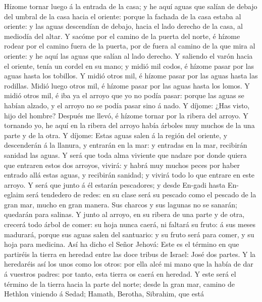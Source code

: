  Hízome tornar luego á la entrada de la casa; y he aquí
aguas que salían de debajo del umbral de la casa hacia el oriente:
porque la fachada de la casa estaba al oriente: y las aguas descendían
de debajo, hacia el lado derecho de la casa, al mediodía del altar.
 Y sacóme por el camino de la puerta del norte, é hízome
rodear por el camino fuera de la puerta, por de fuera al camino de la
que mira al oriente: y he aquí las aguas que salían al lado derecho.
 Y saliendo el varón hacia el oriente, tenía un cordel en
su mano; y midió mil codos, é hízome pasar por las aguas hasta los
tobillos.  Y midió otros mil, é hízome pasar por las aguas
hasta las rodillas. Midió luego otros mil, é hízome pasar por las aguas
hasta los lomos.  Y midió otros mil, é iba ya el arroyo
que yo no podía pasar: porque las aguas se habían alzado, y el arroyo no
se podía pasar sino á nado.  Y díjome: ¿Has visto, hijo
del hombre? Después me llevó, é hízome tornar por la ribera del arroyo.
 Y tornando yo, he aquí en la ribera del arroyo había
árboles muy muchos de la una parte y de la otra.  Y
díjome: Estas aguas salen á la región del oriente, y descenderán á la
llanura, y entrarán en la mar: y entradas en la mar, recibirán sanidad
las aguas.  Y será que toda alma viviente que nadare por
donde quiera que entraren estos dos arroyos, vivirá: y habrá muy muchos
peces por haber entrado allá estas aguas, y recibirán sanidad; y vivirá
todo lo que entrare en este arroyo.  Y será que junto á
él estarán pescadores; y desde En-gadi hasta En-eglaim será tendedero de
redes: en su clase será su pescado como el pescado de la gran mar, mucho
en gran manera.  Sus charcos y sus lagunas no se sanarán;
quedarán para salinas.  Y junto al arroyo, en su ribera
de una parte y de otra, crecerá todo árbol de comer: su hoja nunca
caerá, ni faltará su fruto: á sus meses madurará, porque sus aguas salen
del santuario: y su fruto será para comer, y su hoja para medicina.
 Así ha dicho el Señor Jehová: Este es el término en que
partiréis la tierra en heredad entre las doce tribus de Israel: José dos
partes.  Y la heredaréis así los unos como los otros: por
ella alcé mi mano que la había de dar á vuestros padres: por tanto, esta
tierra os caerá en heredad.  Y este será el término de la
tierra hacia la parte del norte; desde la gran mar, camino de Hethlon
viniendo á Sedad;  Hamath, Berotha, Sibrahim, que está
